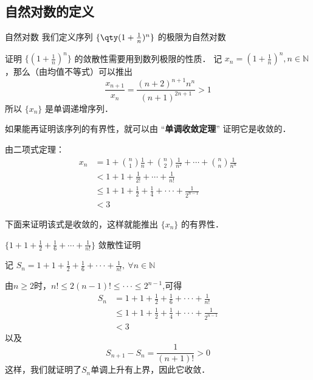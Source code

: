 

\subsection{自然对数的定义}
\begin{definition}{自然对数}
我们定义序列 $\{\qty(1+\frac{1}{n})^n\}$ 的极限为自然对数
\end{definition}
证明 $\{(1+\frac{1}{n})^n\}$ 的敛散性需要用到数列极限的性质．
记 $x_n=(1+\frac{1}{n})^n, n\in \mathbb{N}$，那么（由均值不等式）可以推出
\begin{equation}
  \frac{x_{n+1}}{x_n}=\frac{(n+2)^{n+1}n^{n}}{(n+1)^{2n+1}}>1
\end{equation}
所以 $\{x_n\}$ 是单调递增序列．

  如果能再证明该序列的有界性，就可以由 “\textbf{单调收敛定理}” 证明它是收敛的．

由二项式定理：
\begin{equation}
\begin{aligned}
  x_n&=1+{n\choose 1}\frac{1}{n}+{n\choose 2}\frac{1}{n^2}+\cdots+{n\choose n}\frac{1}{n^n}\\
  &<1+1+\frac{1}{2!}+\cdots+\frac{1}{n!}\\
  &\leq1+1+\frac{1}{2}+\frac{1}{4}+\cdot\cdot\cdot+\frac{1}{2^{n-1}}\\
  &<3
\end{aligned}
\end{equation}

下面来证明该式是收敛的，这样就能推出 $\{x_n\}$ 的有界性．

$\{1+1+\frac{1}{2}+\frac{1}{6}+\cdots+\frac{1}{n!}\}$ 敛散性证明

记 $S_n=1+1+\frac{1}{2}+\frac{1}{6}+\cdot\cdot\cdot+\frac{1}{n!},\ \forall n\in \mathbb{N}$

由$n\geq 2$时，$n!\leq2(n-1)!\leq\cdot\cdot\cdot\leq2^{n-1}$,可得
\begin{equation}
  \begin{aligned}
  S_n&=1+1+\frac{1}{2}+\frac{1}{6}+\cdot\cdot\cdot+\frac{1}{n!}\\
  &\leq1+1+\frac{1}{2}+\frac{1}{4}+\cdot\cdot\cdot+\frac{1}{2^{n-1}}\\
  &<3
  \end{aligned}
\end{equation}
  以及
\begin{equation}
  S_{n+1}-S_n=\frac{1}{(n+1)!}>0
\end{equation}
  这样，我们就证明了{$S_n$}单调上升有上界，因此它收敛．

